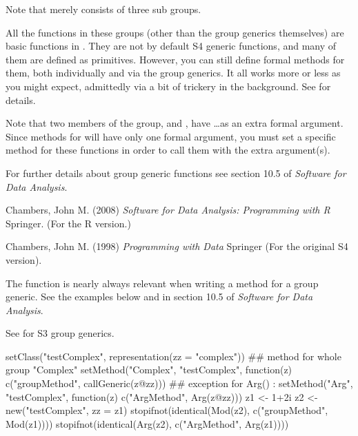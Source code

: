 \begin{Details}
\begin{description}
\end{description}

Note that  merely consists of three sub groups.

All the functions in these groups (other than the group generics
themselves) are basic functions in \R{}.  They are not by default S4 generic
functions, and many of them are defined as primitives.  However, you can still define
formal methods for them, both individually and via the group generics.  It all works more or less as you
might expect, admittedly via a bit of trickery in the background.
See  for details.

Note that two members of the  group,  and
, have \dots as an extra formal argument.
Since methods for  will have only one formal argument,
you must set a specific method for these functions in order to call
them with the extra argument(s).

For further details about group generic functions see section 10.5 of
\emph{Software for Data Analysis}.

\end{Details}
%
\begin{References}\relax
Chambers, John M. (2008)
\emph{Software for Data Analysis: Programming with R}
Springer.  (For the R version.)

Chambers, John M. (1998)
\emph{Programming with Data}
Springer (For the original S4 version).
\end{References}
%
\begin{SeeAlso}\relax
 The function  is nearly always
relevant when writing a method for a group generic.  See the
examples below and in section 10.5 of \emph{Software for Data Analysis}.

See  for S3 group generics.
\end{SeeAlso}
%
\begin{Examples}
\begin{ExampleCode}
setClass("testComplex", representation(zz = "complex"))
## method for whole group "Complex"
setMethod("Complex", "testComplex",
          function(z) c("groupMethod", callGeneric(z@zz)))
## exception for Arg() :
setMethod("Arg", "testComplex",
          function(z) c("ArgMethod", Arg(z@zz)))
z1 <- 1+2i
z2 <- new("testComplex", zz = z1)
stopifnot(identical(Mod(z2), c("groupMethod", Mod(z1))))
stopifnot(identical(Arg(z2), c("ArgMethod", Arg(z1))))
\end{ExampleCode}
\end{Examples}
